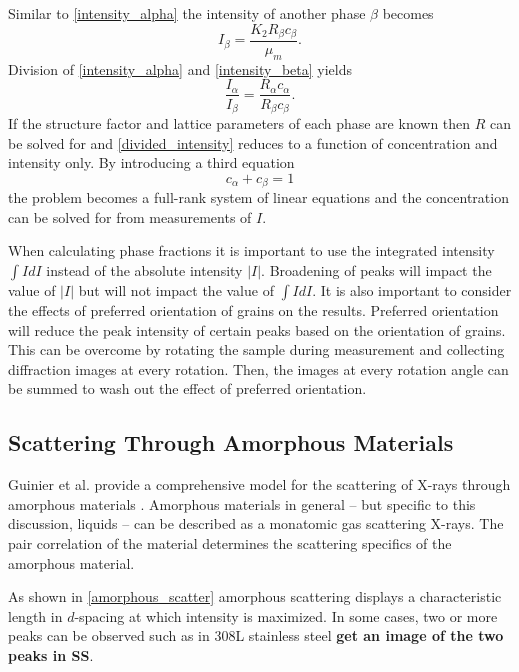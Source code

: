 Similar to \ref{intensity_alpha} the intensity of another phase $\beta$ becomes
\begin{equation}
	I_\beta = \frac{K_2R_\beta c_\beta}{\mu_m}.
	\label{intensity_beta}
\end{equation}
Division of \ref{intensity_alpha} and \ref{intensity_beta} yields
\begin{equation}
	\frac{I_\alpha}{I_\beta} = \frac{R_\alpha c_\alpha}{R_\beta c_\beta}.
	\label{divided_intensity}
\end{equation}
If the structure factor and lattice parameters of each phase are known then $R$ can be solved for and \ref{divided_intensity} reduces to a function of concentration and intensity only. By introducing a third equation
\begin{equation}
	c_\alpha + c_\beta = 1
	\label{phase_unity}
\end{equation}
the problem becomes a full-rank system of linear equations and the concentration can be solved for from measurements of $I$. 

When calculating phase fractions it is important to use the integrated intensity $\int I dI$ instead of the absolute intensity $|I|$. Broadening of peaks will impact the value of $|I|$ but will not impact the value of $\int I dI$. It is also important to consider the effects of preferred orientation of grains on the results. Preferred orientation will reduce the peak intensity of certain peaks based on the orientation of grains. This can be overcome by rotating the sample during measurement and collecting diffraction images at every rotation. Then, the images at every rotation angle can be summed to wash out the effect of preferred orientation.


\subsection{Scattering Through Amorphous Materials}
Guinier et al. provide a comprehensive model for the scattering of X-rays through amorphous materials \cite{Guinier1994}. Amorphous materials in general -- but specific to this discussion, liquids -- can be described as a monatomic gas scattering X-rays. The pair correlation of the material determines the scattering specifics of the amorphous material.

As shown in \ref{amorphous_scatter} amorphous scattering displays a characteristic length in $d$-spacing at which intensity is maximized. In some cases, two or more peaks can be observed such as in 308L stainless steel \textbf{get an image of the two peaks in SS}. 

